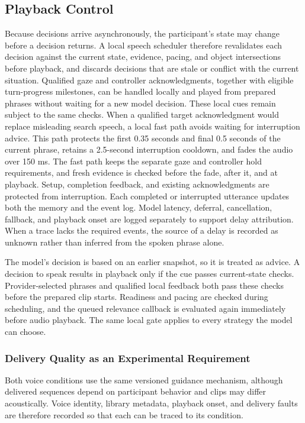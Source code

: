 \subsection{Playback Control}
\label{sec:playback-control}
Because decisions arrive asynchronously, the participant's state may change before a decision returns. A local speech scheduler therefore revalidates each decision against the current state, evidence, pacing, and object intersections before playback, and discards decisions that are stale or conflict with the current situation. Qualified gaze and controller acknowledgments, together with eligible turn-progress milestones, can be handled locally and played from prepared phrases without waiting for a new model decision. These local cues remain subject to the same checks. When a qualified target acknowledgment would replace misleading search speech, a local fast path avoids waiting for interruption advice. This path protects the first 0.35 seconds and final 0.5 seconds of the current phrase, retains a 2.5-second interruption cooldown, and fades the audio over 150 ms. The fast path keeps the separate gaze and controller hold requirements, and fresh evidence is checked before the fade, after it, and at playback. Setup, completion feedback, and existing acknowledgments are protected from interruption. Each completed or interrupted utterance updates both the memory and the event log. Model latency, deferral, cancellation, fallback, and playback onset are logged separately to support delay attribution. When a trace lacks the required events, the source of a delay is recorded as unknown rather than inferred from the spoken phrase alone.

The model's decision is based on an earlier snapshot, so it is treated as advice. A decision to speak results in playback only if the cue passes current-state checks. Provider-selected phrases and qualified local feedback both pass these checks before the prepared clip starts. Readiness and pacing are checked during scheduling, and the queued relevance callback is evaluated again immediately before audio playback. The same local gate applies to every strategy the model can choose.

\subsubsection{Delivery Quality as an Experimental Requirement}
Both voice conditions use the same versioned guidance mechanism, although delivered sequences depend on participant behavior and clips may differ acoustically. Voice identity, library metadata, playback onset, and delivery faults are therefore recorded so that each can be traced to its condition.

